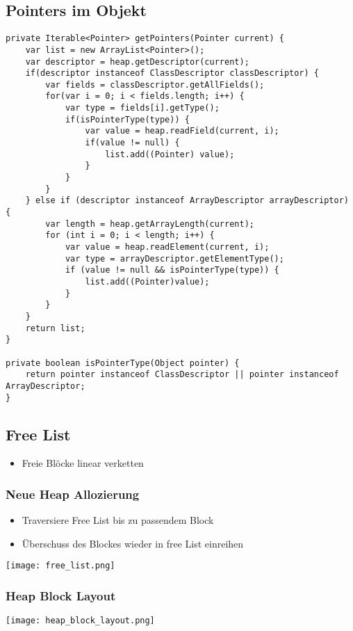 \subsection{Pointers im Objekt}
\begin{lstlisting}
private Iterable<Pointer> getPointers(Pointer current) {
    var list = new ArrayList<Pointer>();
    var descriptor = heap.getDescriptor(current);
    if(descriptor instanceof ClassDescriptor classDescriptor) {
        var fields = classDescriptor.getAllFields();
        for(var i = 0; i < fields.length; i++) {
            var type = fields[i].getType();
            if(isPointerType(type)) {
                var value = heap.readField(current, i);
                if(value != null) {
                    list.add((Pointer) value);
                }
            } 
        }
    } else if (descriptor instanceof ArrayDescriptor arrayDescriptor) {
        var length = heap.getArrayLength(current);
        for (int i = 0; i < length; i++) {
            var value = heap.readElement(current, i);
            var type = arrayDescriptor.getElementType();
            if (value != null && isPointerType(type)) {
                list.add((Pointer)value);
            }
        }
    }
    return list;
}

private boolean isPointerType(Object pointer) {
    return pointer instanceof ClassDescriptor || pointer instanceof ArrayDescriptor;
}
\end{lstlisting}

\subsection{Free List}
\begin{itemize}
    \item Freie Blöcke linear verketten
\end{itemize}
\subsubsection{Neue Heap Allozierung}
\begin{itemize}
    \item Traversiere Free List bis zu passendem Block
    \item Überschuss des Blockes wieder in free List einreihen
\end{itemize}
\texttt{[image: free\_list.png]}
\subsubsection{Heap Block Layout}
\texttt{[image: heap\_block\_layout.png]}
